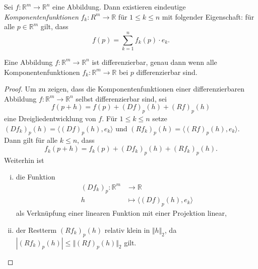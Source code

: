 \documentclass[../main.tex]{subfiles}
\begin{document}
\begin{definition}
  Sei $f \colon \mathbb{R}^m \to \mathbb{R}^n$ eine Abbildung.
  Dann existieren eindeutige \emph{Komponentenfunktionen}
  $f_k \colon R^m \to \mathbb{R}$ 
  für $1 \leq k \leq n$ mit folgender Eigenschaft:
  für alle $p \in \mathbb{R}^m$ gilt, dass
  \[
    f(p) = \sum_{k=1}^{n} f_k(p) \cdot e_k.
  \]
\end{definition}

\begin{lemma}
  Eine Abbildung $f \colon \mathbb{R}^m \to \mathbb{R}^n$ ist differenzierbar,
  genau dann wenn alle Komponentenfunktionen 
  $f_k \colon \mathbb{R}^m \to \mathbb{R}$ bei $p$ differenzierbar sind.
\end{lemma}

\begin{proof}
  Um zu zeigen, dass die Komponentenfunktionen einer
  differenzierbaren Abbildung $f \colon \mathbb{R}^m \to \mathbb{R}^n$
  selbst differenzierbar sind, sei
  \[
    f(p + h) = f(p) + {(Df)}_p(h) + {(Rf)}_p(h)
  \]
  eine Dreigliedentwicklung von $f$.
  Für $1 \leq k \leq n$ 
  setze ${(Df_k)}_p(h) = \langle {(Df)}_p(h), e_k \rangle$ 
  und ${(Rf_k)}_p(h) = \langle {(Rf)}_p(h), e_k \rangle$.
  Dann gilt für alle $k \leq n$, dass
  \[
    f_k(p + h) = f_k(p) + {(Df_k)}_p(h) + {(Rf_k)}_p(h).
  \]
  Weiterhin ist
  \begin{enumerate}[(i)]
    \item die Funktion
      \begin{align*}
        {(Df_k)}_p \colon \mathbb{R}^m & \to \mathbb{R} \\
        h & \mapsto \langle {(Df)}_p(h), e_k \rangle
      \end{align*}
      als Verknüpfung einer linearen Funktion mit einer Projektion
      linear,
    \item der Restterm ${(Rf_k)}_p(h)$ relativ klein
      in $\Vert h \Vert_2$, da 
      \(
        |{(Rf_k)}_p(h)| \leq \Vert {(Rf)}_p(h) \Vert_2
      \)
      gilt.
  \end{enumerate}


\end{proof}
\end{document}
